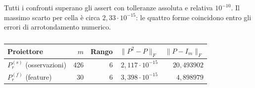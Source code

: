 \documentclass[10pt,a4paper]{article}
\begin{document}
Tutti i confronti superano gli assert con tolleranze assoluta e relativa
$10^{-10}$. Il massimo scarto per cella è circa $2{,}33\cdot10^{-15}$:
le quattro forme coincidono entro gli errori di arrotondamento numerico.

\begin{table}[H]
\centering\small
\caption{}
\label{tab:required-projectors}
\begin{tabular}{@{}lrrrr@{}}
\toprule
Proiettore & $m$ & Rango & $\|P^2-P\|_F$ & $\|P-I_m\|_F$ \\
\midrule
$P_r^{(s)}$ (osservazioni) & 426 & 6 & $2{,}117\cdot10^{-15}$ & $20{,}493902$ \\
$P_r^{(f)}$ (feature) & 30 & 6 & $3{,}398\cdot10^{-15}$ & $4{,}898979$ \\
\bottomrule
\end{tabular}
\end{table}
\end{document}
